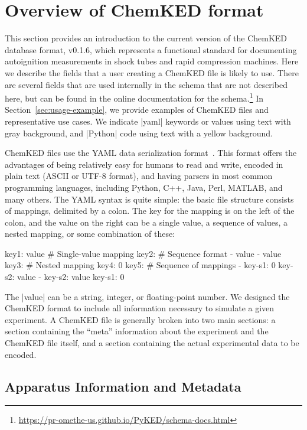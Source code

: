 \documentclass[12pt]{ijck}
\newcommand\ck{ChemKED}
\begin{document}
\section{Overview of ChemKED format}\label{sec:overview-of-format}

This section provides an introduction to the current version of the \ck{} database format, v0.1.6,
which represents a functional standard for documenting autoignition measurements in shock tubes and
rapid compression machines. Here we describe the fields that a user creating a \ck{} file is likely
to use. There are several fields that are used internally in the schema that are not described here,
but can be found in the online documentation for the
schema.\footnote{\url{https://pr-omethe-us.github.io/PyKED/schema-docs.html}} In
Section~\ref{sec:usage-example}, we provide examples of \ck{} files and representative use cases. We
indicate \yabox|yaml| keywords or values using text with gray background, and \pybox|Python| code
using text with a yellow background.

\ck{} files use the YAML data serialization format~\autocite{yaml:1.2}. This
format offers the advantages of being relatively easy for humans to read and write,
encoded in plain text (ASCII or UTF-8 format), and
having parsers in most common programming languages, including Python, C++, Java,
Perl, MATLAB, and many others. The YAML syntax is quite simple: the basic file
structure consists of mappings, delimited by a colon. The key for the mapping is
on the left of the colon, and the value on the right can be a single value,
a sequence of values, a nested mapping, or some combination of these:
%
\begin{yamlbox}
key1: value  # Single-value mapping
key2:  # Sequence format
  - value
  - value
key3:  # Nested mapping
  key4: 0
key5:  # Sequence of mappings
  - key-s1: 0
    key-s2: value
  - key-s2: value
    key-s1: 0
\end{yamlbox}

The \yabox|value| can be a string, integer, or floating-point number. We designed
the \ck{} format to include all information necessary to simulate a
given experiment. A \ck{} file is generally broken into two main sections: a section containing the
``meta'' information about the experiment and the \ck{} file itself, and a section containing the
actual experimental data to be encoded.

\subsection{Apparatus Information and Metadata}\label{sec:apparatus-information-and-metadata}
\end{document}
